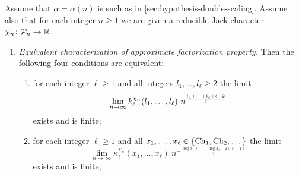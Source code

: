 \documentclass[12pt,usenames,dvipsnames,svgnames,table]{amsart}
\begin{document}
\begin{theorem}
	\label{def:approx-factorization-charactersB}
	Assume that $\alpha=\alpha(n)$
	is such as in \cref{sec:hypothesis-double-scaling}.
	Assume also that for each integer $n\geq 1$ we are given a reducible Jack character 
	$\chi_n\colon\mathcal{P}_{n}\to\mathbb{R}$.
	
	\begin{enumerate}[label=(\emph{\alph*})]
		\setlength\itemsep{2em}
		
		\item \label{item:afp2}
		\emph{Equivalent characterization of 
			approximate factorization property.}
		Then the following four conditions are equivalent: \\
		\begin{enumerate}[label=(\emph{\Alph*})]
			\setlength\itemsep{1em}
			\item \label{item:AFP-A}
			for each integer $\ell \geq 1$ and all integers $l_1,\dots,l_\ell\geq 2$ the limit
			\begin{equation}
			\label{eq:AFPPartitions}
			\lim_{n\to\infty} \kumupartitions^{\chi_n}_\ell (l_1, \dots, l_\ell) \ 
			n^{\frac{l_1+\cdots+l_\ell+\ell-2}{2}} 
			\end{equation}
			exists and is finite;
			
			
			
			
			
			
			
			
			\item 
			\label{item:cumulants-classic-characters}
			for each integer $\ell\geq 1$ and all $x_1,\dots,x_\ell\in\{\operatorname{Ch}_1,\operatorname{Ch}_2,\dots\}$ the limit
			\begin{equation} 
			\label{eq:AFPCumulants-characters}
			\lim_{n\to\infty}    \kappa^{\chi_n}_{\ell}(x_{1},\dots,x_{\ell})\ 
			n^{- \frac{\deg x_1+ \cdots + \deg x_\ell - 2(\ell-1)}{2}} 
			\end{equation}
			exists and is finite;
			

\end{enumerate}
\end{enumerate}
\end{theorem}
\end{document}
